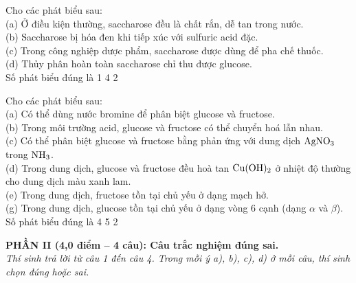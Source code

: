 \documentclass[12pt,a4paper]{article}
\begin{document}
\begin{ex}
Cho các phát biểu sau:\\
(a) Ở điều kiện thường, saccharose đều là chất rắn, dễ tan trong nước.\\
(b) Saccharose bị hóa đen khi tiếp xúc với sulfuric acid đặc.\\
(c) Trong công nghiệp dược phẩm, saccharose được dùng để pha chế thuốc.\\
(d) Thủy phân hoàn toàn saccharose chỉ thu được glucose.\\
Số phát biểu đúng là
\choice
{}
{1}
{4}
{2}
\end{ex}

\begin{ex}
Cho các phát biểu sau:\\
(a) Có thể dùng nước bromine để phân biệt glucose và fructose.\\
(b) Trong môi trường acid, glucose và fructose có thể chuyển hoá lẫn nhau.\\
(c) Có thể phân biệt glucose và fructose bằng phản ứng với dung dịch $\ce{AgNO3}$ trong $\ce{NH3}$.\\
(d) Trong dung dịch, glucose và fructose đều hoà tan $\ce{Cu(OH)2}$ ở nhiệt độ thường cho dung dịch màu xanh lam.\\
(e) Trong dung dịch, fructose tồn tại chủ yếu ở dạng mạch hở.\\
(g) Trong dung dịch, glucose tồn tại chủ yếu ở dạng vòng 6 cạnh (dạng $\alpha$ và $\beta$).\\
Số phát biểu đúng là
\choice
{4}
{}
{5}
{2}
\end{ex}


\vspace{0.3cm}
\noindent
\textbf{PHẦN II (4,0 điểm -- 4 câu): Câu trắc nghiệm đúng sai.}\\
\textit{Thí sinh trả lời từ câu 1 đến câu 4. Trong mỗi ý a), b), c), d) ở mỗi câu, thí sinh chọn đúng hoặc sai.}
\end{document}
